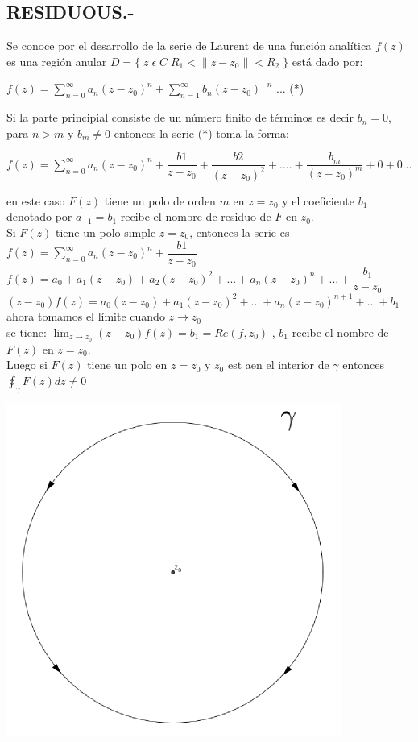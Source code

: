 \documentclass[10pt,a4paper]{article}
\begin{document}
\subsection{RESIDUOUS.-} 
Se conoce por el desarrollo de la serie de Laurent de una función analítica $f(z)$ es una región anular $D = \{ \; z\; \epsilon \; C \; R_1 < \parallel z - z_0 \parallel < R_2 \;\}  $ está dado por: \\
\begin{center}
$\displaystyle{f(z) = \sum_{n = 0}^{\infty} a_n (z-z_0)^n + \sum_{n = 1}^{\infty} b_n (z-z_0)^{-n}}$                                  ... (*)
\end{center}
Si la parte principial consiste de un número finito de términos es decir $b_n = 0$, para $n>m$ y $b_m \neq 0$ entonces la serie (*) toma la forma: \\
\begin{center}
$\displaystyle{f(z) = \sum_{n = 0}^{\infty} a_n (z-z_0)^n + \dfrac{b1}{z-z_0} + \dfrac{b2}{(z-z_0)^2} + .... + \dfrac{b_m}{(z-z_0)^m}+0+0...}$               
\end{center}
en este caso $F(z)$ tiene un polo de orden $m$ en $z=z_0$ y el coeficiente $b_1$ denotado por $a_{-1} = b_1$ recibe el nombre de residuo de $F$ en $z_0$. \\
Si $F(z)$ tiene un polo simple $z = z_0$, entonces la serie es $\displaystyle{f(z) = \sum_{n = 0}^{\infty} a_n (z-z_0)^n + \dfrac{b1}{z-z_0}}$\\
$\displaystyle{f(z) = a_0 + a_1(z-z_0) + a_2(z-z_0)^2 + ... + a_n(z-z_0)^n + ... + \dfrac{b_1}{z - z_0}}$ \\ 
$\displaystyle{(z-z_0)f(z) = a_0(z-z_0) + a_1(z-z_0)^2 + ...+ a_n(z-z_0)^{n+1} + ... + b_1}$ ahora tomamos el límite cuando $z \to z_0$ \\
se tiene: $\displaystyle{\lim_{z \to z_0} (z-z_0)f(z) = b_1=Re(f,z_0)}$ , $b_1$ recibe el nombre de $F(z)$ en $z = z_0$. \\                             
Luego si $F(z)$ tiene un polo en $z = z_0$ y $z_0$ est aen el interior de $\gamma$ entonces $\displaystyle{\oint_{\gamma} F(z)dz \neq 0}$ 
\begin{center}
\includegraphics[scale=0.25]{1.png}
\end{center}
\end{document}
